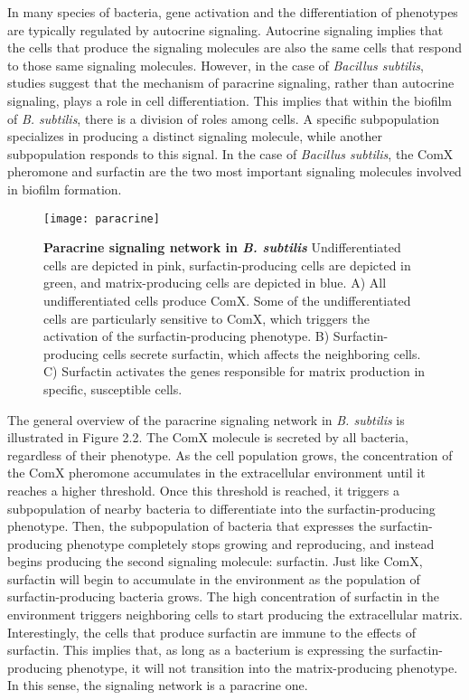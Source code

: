 In many species of bacteria, gene activation and the differentiation of phenotypes are typically regulated by autocrine signaling. Autocrine signaling implies that the cells that produce the signaling molecules are also the same cells that respond to those same signaling molecules. However, in the case of \textit{Bacillus subtilis}, studies suggest that the mechanism of paracrine signaling, rather than autocrine signaling, plays a role in cell differentiation.{\footnotesize\cite{Lpez2009}} This implies that within the biofilm of \textit{B. subtilis}, there is a division of roles among cells. A specific subpopulation specializes in producing a distinct signaling molecule, while another subpopulation responds to this signal. In the case of \textit{Bacillus subtilis}, the ComX pheromone and surfactin are the two most important signaling molecules involved in biofilm formation.{\footnotesize\cite{Chai2011}\cite{Lpez2009}}



\begin{figure}[h]
    \centering
    \texttt{[image: paracrine]}
    \caption{\footnotesize \textbf{Paracrine signaling network in \textit{B. subtilis}} Undifferentiated cells are depicted in pink, surfactin-producing cells are depicted in green, and matrix-producing cells are depicted in blue. A) All undifferentiated cells produce ComX. Some of the undifferentiated cells are particularly sensitive to ComX, which triggers the activation of the surfactin-producing phenotype. B) Surfactin-producing cells secrete surfactin, which affects the neighboring cells. C) Surfactin activates the genes responsible for matrix production in specific, susceptible cells.{\footnotesize\cite{Chai2011}\cite{Lpez2009}}}


\end{figure}
The general overview of the paracrine signaling network in \textit{B. subtilis} is illustrated in Figure 2.2. The ComX molecule is secreted by all bacteria, regardless of their phenotype. As the cell population grows, the concentration of the ComX pheromone accumulates in the extracellular environment until it reaches a higher threshold. Once this threshold is reached, it triggers a subpopulation of nearby bacteria to differentiate into the surfactin-producing phenotype. Then, the subpopulation of bacteria that expresses the surfactin-producing phenotype completely stops growing and reproducing{\footnotesize\cite{Lpez2009}}, and instead begins producing the second signaling molecule: surfactin. Just like ComX, surfactin will begin to accumulate in the environment as the population of surfactin-producing bacteria grows. The high concentration of surfactin in the environment triggers neighboring cells to start producing the extracellular matrix. Interestingly, the cells that produce surfactin are immune to the effects of surfactin. This implies that, as long as a bacterium is expressing the surfactin-producing phenotype, it will not transition into the matrix-producing phenotype. In this sense, the signaling network is a paracrine one.{\footnotesize\cite{Lpez2009}}

